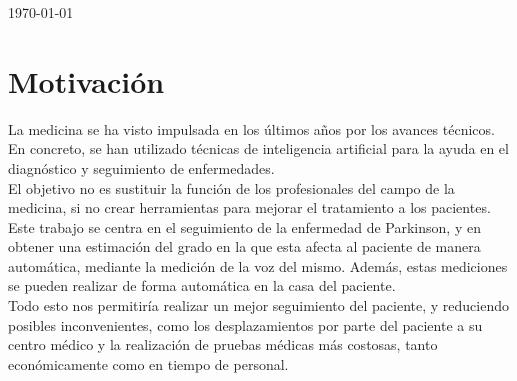 \begin{titlepage}

{\large \today}\\[3cm] %


 

\vfill %

\end{titlepage}

\tableofcontents
\newpage

\section{Motivación}

La medicina se ha visto impulsada en los últimos años por los avances técnicos. En concreto, se han utilizado técnicas de inteligencia artificial para la ayuda en el diagnóstico y seguimiento de enfermedades.\\

El objetivo no es sustituir la función de los profesionales del campo de la medicina, si no crear herramientas para mejorar el tratamiento a los pacientes.\\

Este trabajo se centra en el seguimiento de la enfermedad de Parkinson, y en obtener una estimación del grado en la que esta afecta al paciente de manera automática, mediante la medición de la voz del mismo. Además, estas mediciones se pueden realizar de forma automática en la casa del paciente.\\

Todo esto nos permitiría realizar un mejor seguimiento del paciente, y reduciendo posibles inconvenientes, como los desplazamientos por parte del paciente a su centro médico y la realización de pruebas médicas más costosas, tanto económicamente como en tiempo de personal.\\


